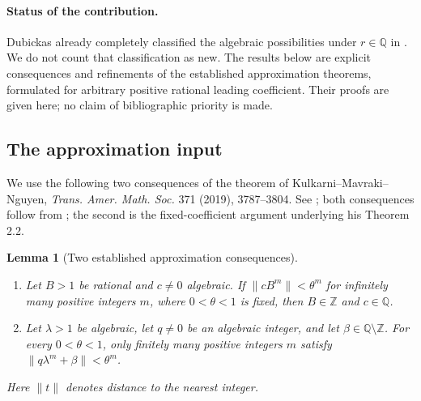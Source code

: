 \documentclass[11pt,a4paper]{article}
\newtheorem{lemma}[theorem]{Lemma}
\theoremstyle{definition}
\theoremstyle{remark}
\numberwithin{equation}{section}
\begin{document}
\paragraph{Status of the contribution.}
Dubickas already completely classified the algebraic possibilities under
$r\in\mathbb Q$ in \cite{Dubickas}.
We do not count that classification as new.  The results below are
explicit consequences and refinements of the established approximation
theorems, formulated for arbitrary positive rational leading coefficient.
Their proofs are given here; no claim of bibliographic priority is made.

\subsection{The approximation input}

We use the following two consequences of the theorem of
Kulkarni--Mavraki--Nguyen, \emph{Trans. Amer. Math. Soc.} 371 (2019),
3787--3804.  See \cite{KMN2019,CorvajaZannier2004}; both consequences follow from
\cite[Theorem~1.2]{Kumar2023};
the second is the fixed-coefficient argument underlying his Theorem 2.2.

\begin{lemma}[Two established approximation consequences]\label{tw:lem:growth-KMN}
\begin{enumerate}
\item Let $B>1$ be rational and $c\ne0$ algebraic.  If
$\|cB^m\|<\theta^m$ for infinitely many positive integers $m$, where
$0<\theta<1$ is fixed, then $B\in\mathbb Z$ and $c\in\mathbb Q$.
\item Let $\lambda>1$ be algebraic, let $q\ne0$ be an algebraic
integer, and let $\beta\in\mathbb Q\setminus\mathbb Z$.
For every $0<\theta<1$, only finitely many positive integers $m$ satisfy
$\|q\lambda^m+\beta\|<\theta^m$.
\end{enumerate}
Here $\|t\|$ denotes distance to the nearest integer.
\end{lemma}
\end{document}
